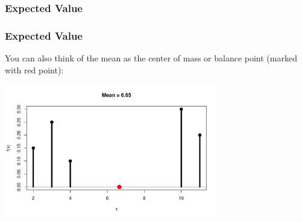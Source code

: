 \documentclass[handout]{beamer}
\newcommand{\blue}[1]{\textcolor{blue2}{#1}}
\newcommand{\prob}{\mbox{Pr}}
\newcommand{\E}{\mathbb{E}}
\begin{document}
\begin{frame}
\frametitle{Expected Value}
%
\end{frame}


\begin{frame}
\frametitle{Expected Value}
You can also think of the mean as the \blue{center of mass or balance point} (marked with red point):

\begin{center}
\includegraphics[width=0.7\textwidth]{figure/mean}
\end{center}

\end{frame}
\end{document}
